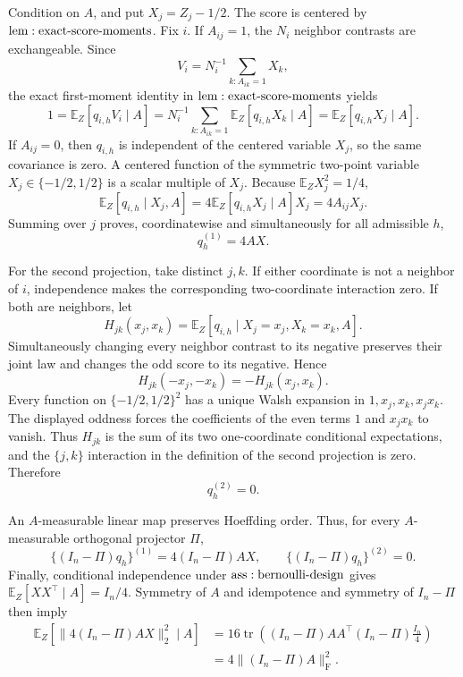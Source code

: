 Condition on \(A\), and put \(X_j=Z_j-1/2\).  The score is centered by \({\rm lem:exact\text{-}score\text{-}moments}\).  Fix \(i\).  If \(A_{ij}=1\), the \(N_i\) neighbor contrasts are exchangeable.  Since
\[
 V_i=N_i^{-1}\sum_{k:A_{ik}=1}X_k,
\]
the exact first-moment identity in \({\rm lem:exact\text{-}score\text{-}moments}\) yields
\[
 1=\mathbb E_Z[q_{i,h}V_i\mid A]
 =N_i^{-1}\sum_{k:A_{ik}=1}\mathbb E_Z[q_{i,h}X_k\mid A]
 =\mathbb E_Z[q_{i,h}X_j\mid A].
\]
If \(A_{ij}=0\), then \(q_{i,h}\) is independent of the centered variable \(X_j\), so the same covariance is zero.  A centered function of the symmetric two-point variable \(X_j\in\{-1/2,1/2\}\) is a scalar multiple of \(X_j\).  Because \(\mathbb E_ZX_j^2=1/4\),
\[
 \mathbb E_Z[q_{i,h}\mid X_j,A]
 =4\mathbb E_Z[q_{i,h}X_j\mid A]X_j=4A_{ij}X_j.
\]
Summing over \(j\) proves, coordinatewise and simultaneously for all admissible \(h\),
\[
 q_h^{(1)}=4AX.
\]

For the second projection, take distinct \(j,k\).  If either coordinate is not a neighbor of \(i\), independence makes the corresponding two-coordinate interaction zero.  If both are neighbors, let
\[
 H_{jk}(x_j,x_k)=\mathbb E_Z[q_{i,h}\mid X_j=x_j,X_k=x_k,A].
\]
Simultaneously changing every neighbor contrast to its negative preserves their joint law and changes the odd score to its negative.  Hence
\[
 H_{jk}(-x_j,-x_k)=-H_{jk}(x_j,x_k).
\]
Every function on \(\{-1/2,1/2\}^2\) has a unique Walsh expansion in \(1,x_j,x_k,x_jx_k\).  The displayed oddness forces the coefficients of the even terms \(1\) and \(x_jx_k\) to vanish.  Thus \(H_{jk}\) is the sum of its two one-coordinate conditional expectations, and the \(\{j,k\}\) interaction in the definition of the second projection is zero.  Therefore
\[
 q_h^{(2)}=0.
\]

An \(A\)-measurable linear map preserves Hoeffding order.  Thus, for every \(A\)-measurable orthogonal projector \(\Pi\),
\[
 \{(I_n-\Pi)q_h\}^{(1)}=4(I_n-\Pi)AX,
 \qquad \{(I_n-\Pi)q_h\}^{(2)}=0.
\]
Finally, conditional independence under \({\rm ass:bernoulli\text{-}design}\) gives \(\mathbb E_Z[XX^\top\mid A]=I_n/4\).  Symmetry of \(A\) and idempotence and symmetry of \(I_n-\Pi\) then imply
\[
\begin{aligned}
 \mathbb E_Z\!\left[\|4(I_n-\Pi)AX\|_2^2\mid A\right]
 &=16\operatorname{tr}\!\left((I_n-\Pi)AA^\top(I_n-\Pi)\frac{I_n}{4}\right)\\
 &=4\|(I_n-\Pi)A\|_{\mathrm F}^2.
\end{aligned}
\]